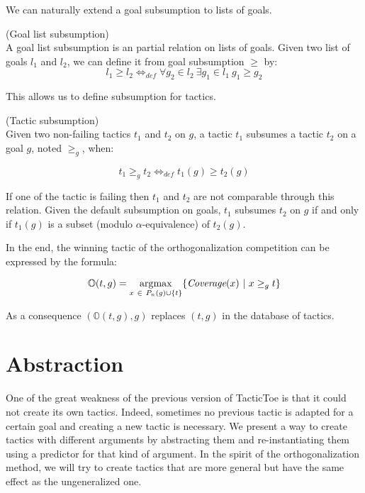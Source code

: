 \documentclass[runningheads,a4paper,draft]{svjour3}
\DeclareMathOperator*{\argmax}{\arg\!\max}
\def\tactictoe{\textsf{TacticToe}\xspace}
\begin{document}
We can naturally extend a goal subsumption to lists of goals.
\begin{definition} (Goal list subsumption)\\
A goal list subsumption is an partial relation on lists of goals.
Given two list of goals $l_1$ and $l_2$, we can define it from goal 
subsumption $\ge$ by:
\[l_1 \ge l_2  \Leftrightarrow_{def} \forall g_2 \in l_2\ \exists g_1 \in l_1\ 
g_1 \ge g_2\]
\end{definition}

This allows us to define subsumption for tactics.
\begin{definition}(Tactic subsumption)\\  
Given two non-failing tactics $t_1$ and $t_2$ on $g$, a tactic $t_1$ subsumes a 
tactic $t_2$ on a goal $g$, noted $\ge_g$, when:

 \[t_1 \ge_g t_2 \Leftrightarrow_{def} t_1(g) \ge t_2(g)\]

If one of the tactic is failing then $t_1$ and $t_2$ are not comparable through 
this relation.
Given the default subsumption on goals, $t_1$ subsumes $t_2$ on $g$ if and only 
if $t_1(g)$ is a subset (modulo $\alpha$-equivalence) of $t_2(g)$. 
\end{definition}

In the end, the winning tactic of the orthogonalization competition can be 
expressed by the formula:

\[\mathbb{O}(t,g) = \argmax_{x\ \in\ P_n(g) \cup \lbrace t \rbrace} \lbrace 
\textit{\mbox{Coverage}}(x)\ 
|\ x \ge_g t\rbrace\] 
                   
As a consequence $(\mathbb{O}(t,g),g)$ replaces $(t,g)$ in the database of 
tactics. 

\section{Abstraction}\label{sec:synthesis}
One of the great weakness of the previous version of \tactictoe is that
it could not create its own tactics. Indeed, sometimes no previous tactic is 
adapted for a certain goal and creating a new tactic is necessary.
We present a way to create tactics with different arguments
by abstracting them and re-instantiating them using a predictor for that kind 
of argument. In the spirit of the orthogonalization method, we will try to 
create tactics that are more general but have the same effect as the 
ungeneralized one.
\end{document}
